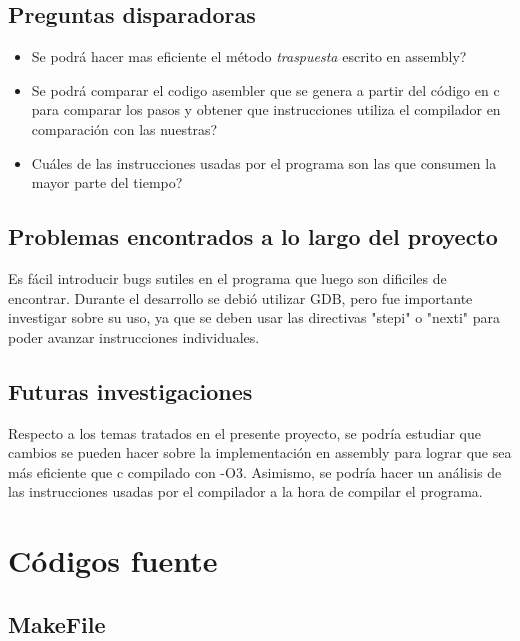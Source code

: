 \documentclass[11pt,a4paper]{article}
\begin{document}
\subsection{Preguntas disparadoras}

\begin{itemize}
\item Se podr\'a hacer mas eficiente el m\'etodo \textit{traspuesta} escrito en assembly?
\item Se podr\'a comparar el codigo asembler que se genera a partir del c\'odigo en c para comparar los pasos y obtener que instrucciones utiliza el compilador en comparaci\'on con las nuestras?
\item Cu\'ales de las instrucciones usadas por el programa son las que consumen la mayor parte del tiempo?
\end{itemize}

\subsection{Problemas encontrados a lo largo del proyecto}

Es f\'acil introducir bugs sutiles en el programa que luego son dificiles de 
encontrar. Durante el desarrollo se debi\'o utilizar GDB, pero fue importante
investigar sobre su uso, ya que se deben usar las directivas "stepi" o "nexti"
para poder avanzar instrucciones individuales.

\subsection{Futuras investigaciones}

Respecto a los temas tratados en el presente proyecto, se podr\'ia estudiar que cambios se pueden hacer sobre la implementaci\'on en assembly para lograr que sea m\'as eficiente que c compilado con -O3. Asimismo, se podr\'ia hacer un an\'alisis de las instrucciones usadas por el compilador a la hora de compilar el programa.


\newpage

\section{C\'odigos fuente}

\subsection{MakeFile}
\end{document}
